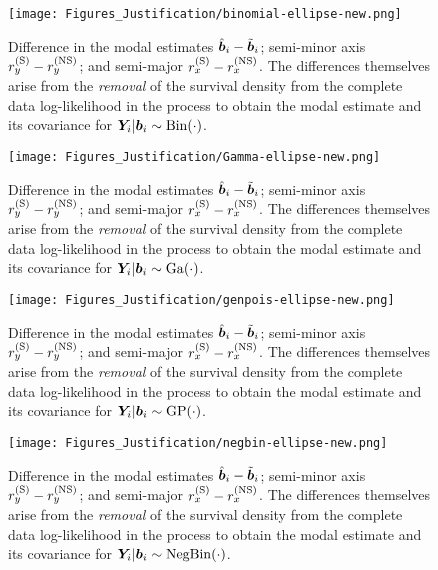 \begin{figure}[ht]
    \centering
    \texttt{[image: Figures\_Justification/binomial-ellipse-new.png]}
    \caption{Difference in the modal estimates $\hat{\bm{b}}_i-\tilde{\bm{b}}_i$; semi-minor axis $r_y^{(\mathrm{S})}-r_y^{(\mathrm{NS})}$; and semi-major $r_x^{(\mathrm{S})}-r_x^{(\mathrm{NS})}$. The differences themselves arise from the \textit{removal} of the survival density from the complete data log-likelihood in the process to obtain the modal estimate and its covariance for $\bm{Y}_i|\bm{b}_i\sim\mathrm{Bin}\!\left(\cdot\right)$.}
    \label{fig:appendix-justification-ellipse-binomial}
\end{figure}

\begin{figure}[ht]
    \centering
    \texttt{[image: Figures\_Justification/Gamma-ellipse-new.png]}
    \caption{Difference in the modal estimates $\hat{\bm{b}}_i-\tilde{\bm{b}}_i$; semi-minor axis $r_y^{(\mathrm{S})}-r_y^{(\mathrm{NS})}$; and semi-major $r_x^{(\mathrm{S})}-r_x^{(\mathrm{NS})}$. The differences themselves arise from the \textit{removal} of the survival density from the complete data log-likelihood in the process to obtain the modal estimate and its covariance for $\bm{Y}_i|\bm{b}_i\sim\mathrm{Ga}\!\left(\cdot\right)$.}
    \label{fig:appendix-justification-ellipse-gamma}
\end{figure}

\begin{figure}[ht]
    \centering
    \texttt{[image: Figures\_Justification/genpois-ellipse-new.png]}
    \caption{Difference in the modal estimates $\hat{\bm{b}}_i-\tilde{\bm{b}}_i$; semi-minor axis $r_y^{(\mathrm{S})}-r_y^{(\mathrm{NS})}$; and semi-major $r_x^{(\mathrm{S})}-r_x^{(\mathrm{NS})}$. The differences themselves arise from the \textit{removal} of the survival density from the complete data log-likelihood in the process to obtain the modal estimate and its covariance for $\bm{Y}_i|\bm{b}_i\sim\mathrm{GP}\!\left(\cdot\right)$.}
    \label{fig:appendix-justification-ellipse-genpois}
\end{figure}

\begin{figure}[ht]
    \centering
    \texttt{[image: Figures\_Justification/negbin-ellipse-new.png]}
    \caption{Difference in the modal estimates $\hat{\bm{b}}_i-\tilde{\bm{b}}_i$; semi-minor axis $r_y^{(\mathrm{S})}-r_y^{(\mathrm{NS})}$; and semi-major $r_x^{(\mathrm{S})}-r_x^{(\mathrm{NS})}$. The differences themselves arise from the \textit{removal} of the survival density from the complete data log-likelihood in the process to obtain the modal estimate and its covariance for $\bm{Y}_i|\bm{b}_i\sim\mathrm{NegBin}\!\left(\cdot\right)$.}
    \label{fig:appendix-justification-ellipse-negbin}
\end{figure}

